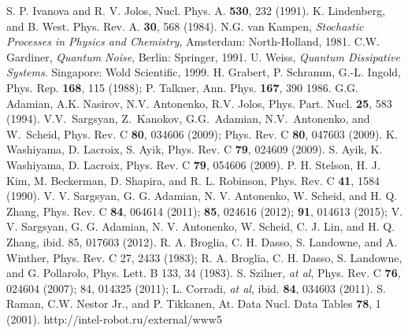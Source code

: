 \documentclass[preprint,review,12pt]{elsarticle}
\begin{document}
\begin{thebibliography}{99}
                      S. P. Ivanova and R. V. Jolos, Nucl. Phys. A. {\bf 530}, 232 (1991).
       K. Lindenberg,  and B. West. Phys. Rev. A. {\bf 30}, 568 (1984).
      N.G. van Kampen, {\it Stochastic Processes in Physics and Chemistry}, Amsterdam: North-Holland, 1981.
    C.W. Gardiner, {\it Quantum Noise}, Berlin: Springer, 1991.
       U. Weiss, {\it Quantum Dissipative Systems}. Singapore: Wold Scientific, 1999.
     H. Grabert, P. Schramm, G.-L. Ingold, Phys. Rep. {\bf 168}, 115 (1988); P. Talkner, Ann. Phys. {\bf 167}, 390 1986.
        G.G. Adamian, A.K. Nasirov, N.V. Antonenko, R.V. Jolos, Phys. Part. Nucl. {\bf 25}, 583 (1994).
        V.V.~Sargsyan, Z.~Kanokov, G.G.~Adamian, N.V.~Antonenko, and W.~Scheid,
                      Phys. Rev. C {\bf 80}, 034606 (2009); Phys. Rev. C {\bf 80}, 047603 (2009).
        K. Washiyama, D. Lacroix, S. Ayik, Phys. Rev. C {\bf 79}, 024609 (2009).
       S. Ayik, K. Washiyama, D. Lacroix, Phys. Rev. C {\bf 79}, 054606 (2009).
     P. H. Stelson, H. J. Kim, M. Beckerman, D. Shapira, and R. L. Robinson, Phys. Rev. C {\bf 41}, 1584 (1990).
    V. V. Sargsyan, G. G. Adamian, N. V. Antonenko, W. Scheid, and H. Q. Zhang, Phys. Rev. C {\bf 84}, 064614 (2011);
                      {\bf 85}, 024616 (2012); {\bf 91}, 014613 (2015);
                      V. V. Sargsyan, G. G. Adamian, N. V. Antonenko, W. Scheid, C. J. Lin, and H. Q. Zhang, ibid. 85, 017603 (2012).
     R. A. Broglia, C. H. Dasso, S. Landowne, and A. Winther, Phys. Rev. C 27, 2433 (1983); R. A. Broglia, C. H. Dasso,
                      S. Landowne, and G. Pollarolo, Phys. Lett. B 133, 34 (1983).
     S. Szilner, {\it at al}, Phys. Rev. C {\bf 76}, 024604 (2007); 84, 014325 (2011);
                      L. Corradi, {\it at al}, ibid. {\bf 84}, 034603 (2011).
       S. Raman, C.W. Nestor Jr., and P. Tikkanen, At. Data Nucl. Data Tables {\bf 78}, 1 (2001).
    http://intel-robot.ru/external/www5

\end{thebibliography}
\end{document}

